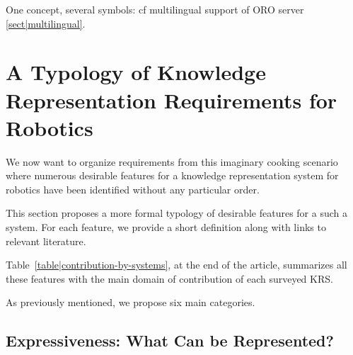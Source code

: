 One concept, several symbols: cf multilingual support of ORO server \ref{sect|multilingual}.


\section{A Typology of Knowledge Representation Requirements for Robotics}
\label{sect|features}

We now want to organize requirements from this imaginary cooking scenario where
numerous desirable features for a knowledge representation system for robotics
have been identified without any particular order.

This section proposes a more formal typology of desirable features for a such a
system. For each feature, we provide a short definition along with links to
relevant literature.

Table~\ref{table|contribution-by-systems}, at the end of the article,
summarizes all these features with the main domain of contribution of each
surveyed KRS.

As previously mentioned, we propose six main categories.

\begin{scriptsize}
\begin{center}
\end{center}
\end{scriptsize}

\subsection{Expressiveness: What Can be Represented?}
\label{sect|expressiveness}

\begin{scriptsize}
\begin{center}
\end{center}
\end{scriptsize}


